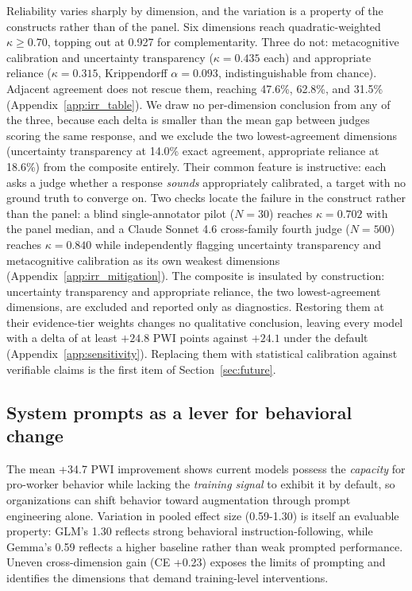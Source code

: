 \documentclass{article}
\begin{document}
Reliability varies sharply by dimension, and the variation is a property of the constructs rather than of the panel. Six dimensions reach quadratic-weighted $\kappa \geq 0.70$, topping out at 0.927 for complementarity. Three do not: metacognitive calibration and uncertainty transparency ($\kappa = 0.435$ each) and appropriate reliance ($\kappa = 0.315$, Krippendorff $\alpha = 0.093$, indistinguishable from chance). Adjacent agreement does not rescue them, reaching 47.6\%, 62.8\%, and 31.5\% (Appendix~\ref{app:irr_table}). We draw no per-dimension conclusion from any of the three, because each delta is smaller than the mean gap between judges scoring the same response, and we exclude the two lowest-agreement dimensions (uncertainty transparency at 14.0\% exact agreement, appropriate reliance at 18.6\%) from the composite entirely. Their common feature is instructive: each asks a judge whether a response \emph{sounds} appropriately calibrated, a target with no ground truth to converge on. Two checks locate the failure in the construct rather than the panel: a blind single-annotator pilot ($N = 30$) reaches $\kappa = 0.702$ with the panel median, and a Claude Sonnet 4.6 cross-family fourth judge ($N = 500$) reaches $\kappa = 0.840$ while independently flagging uncertainty transparency and metacognitive calibration as its own weakest dimensions (Appendix~\ref{app:irr_mitigation}). The composite is insulated by construction: uncertainty transparency and appropriate reliance, the two lowest-agreement dimensions, are excluded and reported only as diagnostics. Restoring them at their evidence-tier weights changes no qualitative conclusion, leaving every model with a delta of at least $+24.8$ PWI points against $+24.1$ under the default (Appendix~\ref{app:sensitivity}). Replacing them with statistical calibration against verifiable claims is the first item of Section~\ref{sec:future}.

\subsection{System prompts as a lever for behavioral change}

The mean +34.7 PWI improvement shows current models possess the \textit{capacity} for pro-worker behavior while lacking the \textit{training signal} to exhibit it by default, so organizations can shift behavior toward augmentation through prompt engineering alone. Variation in pooled effect size (0.59-1.30) is itself an evaluable property: GLM's 1.30 reflects strong behavioral instruction-following, while Gemma's 0.59 reflects a higher baseline rather than weak prompted performance. Uneven cross-dimension gain (CE +0.23) exposes the limits of prompting and identifies the dimensions that demand training-level interventions.
\end{document}
